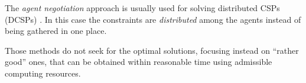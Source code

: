 The \emph{agent negotiation} approach is usually used for solving distributed
CSPs (DCSPs) \cite{DCSPagent1998, DCSP2013, CSPagent2014}.
In this case the constraints are \emph{distributed} among the agents instead of
being gathered in one place.

\todo {}

\medskip

Those methods do not seek for the optimal solutions, focusing instead on
``rather good'' ones, that can be obtained within reasonable time using admissible
computing resources.
